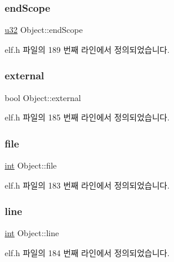 \subsubsection{\texorpdfstring{end\+Scope}{endScope}}
{\footnotesize\ttfamily \mbox{\hyperlink{_system_8h_a10e94b422ef0c20dcdec20d31a1f5049}{u32}} Object\+::end\+Scope}



elf.\+h 파일의 189 번째 라인에서 정의되었습니다.

\mbox{\label{struct_object_add5f5917bb52d63d6b80e56c8f48ba59}} 
\subsubsection{\texorpdfstring{external}{external}}
{\footnotesize\ttfamily bool Object\+::external}



elf.\+h 파일의 185 번째 라인에서 정의되었습니다.

\mbox{\label{struct_object_a378b52bc4620a2ec9df0f0d3d0a1b48a}} 
\subsubsection{\texorpdfstring{file}{file}}
{\footnotesize\ttfamily \mbox{\hyperlink{_util_8cpp_a0ef32aa8672df19503a49fab2d0c8071}{int}} Object\+::file}



elf.\+h 파일의 183 번째 라인에서 정의되었습니다.

\mbox{\label{struct_object_aa3f350a46fefbb0a82c0a00dede2294a}} 
\subsubsection{\texorpdfstring{line}{line}}
{\footnotesize\ttfamily \mbox{\hyperlink{_util_8cpp_a0ef32aa8672df19503a49fab2d0c8071}{int}} Object\+::line}



elf.\+h 파일의 184 번째 라인에서 정의되었습니다.

\mbox{\label{struct_object_ad1adf7cf51dfe7a95d2802696f93bd0f}} 
